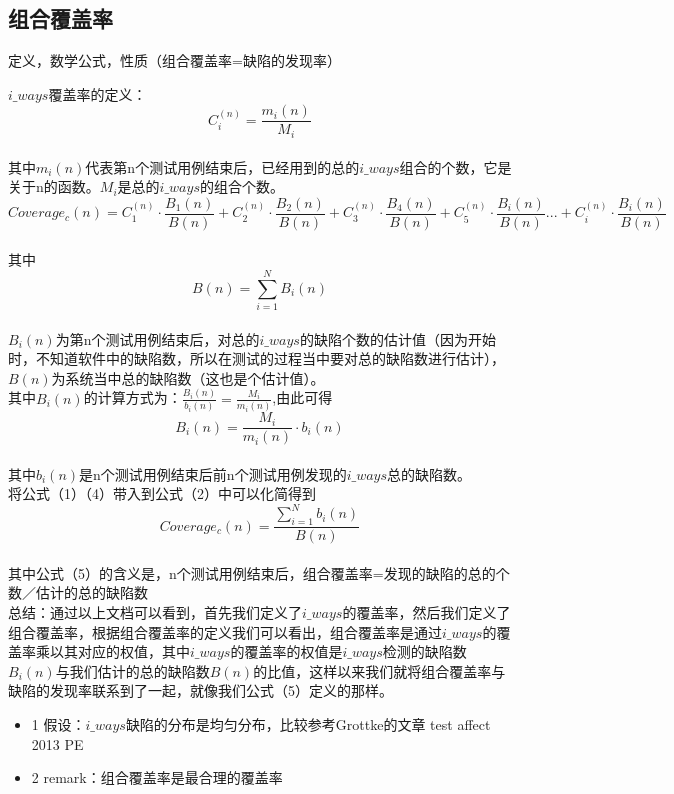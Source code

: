 \documentclass[10pt,journal,letterpaper,compsoc]{IEEEtran}
\begin{document}
\begin{CJK}{UTF8}{gkai}
\subsection{ 组合覆盖率}
定义，数学公式，性质（组合覆盖率=缺陷的发现率）

$i\_ways$覆盖率的定义：
\begin{equation}
C_i^{(n)}=\frac{m_i(n)}{M_i}
\end{equation}
\\其中$m_i(n)$代表第n个测试用例结束后，已经用到的总的$i\_ways$组合的个数，它是关于n的函数。$M_i$是总的$i\_ways$的组合个数。
\begin{equation}
Coverage_c(n)=C_1^{(n)} \cdot \frac{B_1(n)}{B(n)}+C_2^{(n)} \cdot \frac{B_2(n)}{B(n)}+C_3^{(n)} \cdot \frac{B_4(n)}{B(n)}+C_5^{(n)} \cdot \frac{B_i(n)}{B(n)}...+C_i^{(n)} \cdot \frac{B_i(n)}{B(n)}
\end{equation}
\\其中
\begin{equation}
B(n)= \sum_{i=1}^N B_i(n) 
\end{equation}
\\$B_i(n)$为第n个测试用例结束后，对总的$i\_ways$的缺陷个数的估计值（因为开始时，不知道软件中的缺陷数，所以在测试的过程当中要对总的缺陷数进行估计），$B(n)$为系统当中总的缺陷数（这也是个估计值）。
\\其中$B_i(n)$的计算方式为：$\frac{B_i(n)}{b_i(n)}=\frac{M_i}{m_i(n)}$,由此可得
\begin{equation}
B_i(n)=\frac{M_i}{m_i(n)} \cdot b_i(n)
\end{equation}
\\其中$b_i(n)$是n个测试用例结束后前n个测试用例发现的$i\_ways$总的缺陷数。
\\将公式（1）（4）带入到公式（2）中可以化简得到
\begin{equation}
Coverage_c(n)=\frac{\sum_{i=1}^N b_i(n)}{B(n)}
\end{equation}
\\其中公式（5）的含义是，n个测试用例结束后，组合覆盖率=发现的缺陷的总的个数／估计的总的缺陷数
\\总结：通过以上文档可以看到，首先我们定义了$i\_ways$的覆盖率，然后我们定义了组合覆盖率，根据组合覆盖率的定义我们可以看出，组合覆盖率是通过$i\_ways$的覆盖率乘以其对应的权值，其中$i\_ways$的覆盖率的权值是$i\_ways$检测的缺陷数$B_i(n)$与我们估计的总的缺陷数$B(n)$的比值，这样以来我们就将组合覆盖率与缺陷的发现率联系到了一起，就像我们公式（5）定义的那样。

\begin{itemize}
    \item 1 假设：$i\_ways$缺陷的分布是均匀分布，比较参考Grottke的文章 test affect 2013 PE
    \item 2 remark：组合覆盖率是最合理的覆盖率
\end{itemize}

\end{CJK}
\end{document}
